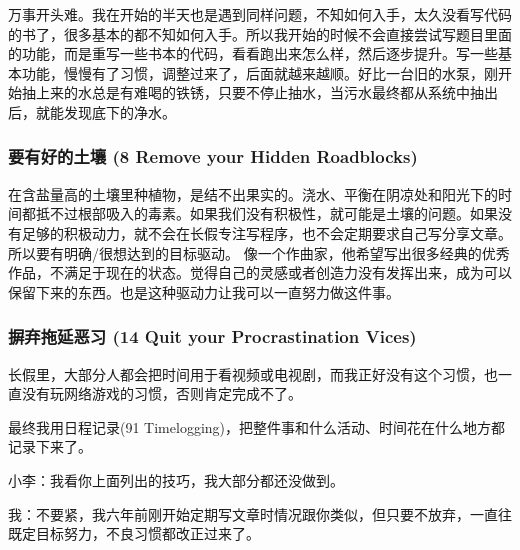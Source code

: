 万事开头难。我在开始的半天也是遇到同样问题，不知如何入手，太久没看写代码的书了，很多基本的都不知如何入手。所以我开始的时候不会直接尝试写题目里面的功能，而是重写一些书本的代码，看看跑出来怎么样，然后逐步提升。写一些基本功能，慢慢有了习惯，调整过来了，后面就越来越顺。好比一台旧的水泵，刚开始抽上来的水总是有难喝的铁锈，只要不停止抽水，当污水最终都从系统中抽出后，就能发现底下的净水。

\hypertarget{ux8981ux6709ux597dux7684ux571fux58e4-8-remove-your-hidden-roadblocks}{%
\subsubsection{要有好的土壤 (8 Remove your Hidden
Roadblocks)}\label{ux8981ux6709ux597dux7684ux571fux58e4-8-remove-your-hidden-roadblocks}}

在含盐量高的土壤里种植物，是结不出果实的。浇水、平衡在阴凉处和阳光下的时间都抵不过根部吸入的毒素。如果我们没有积极性，就可能是土壤的问题。如果没有足够的积极动力，就不会在长假专注写程序，也不会定期要求自己写分享文章。所以要有明确/很想达到的目标驱动。
像一个作曲家，他希望写出很多经典的优秀作品，不满足于现在的状态。觉得自己的灵感或者创造力没有发挥出来，成为可以保留下来的东西。也是这种驱动力让我可以一直努力做这件事。\\

\hypertarget{ux6452ux5f03ux62d6ux5ef6ux6076ux4e60-14-quit-your-procrastination-vices}{%
\subsubsection{摒弃拖延恶习 (14 Quit your Procrastination
Vices)}\label{ux6452ux5f03ux62d6ux5ef6ux6076ux4e60-14-quit-your-procrastination-vices}}

长假里，大部分人都会把时间用于看视频或电视剧，而我正好没有这个习惯，也一直没有玩网络游戏的习惯，否则肯定完成不了。

最终我用日程记录(91
Timelogging)，把整件事和什么活动、时间花在什么地方都记录下来了。

小李：我看你上面列出的技巧，我大部分都还没做到。

我：不要紧，我六年前刚开始定期写文章时情况跟你类似，但只要不放弃，一直往既定目标努力，不良习惯都改正过来了。

